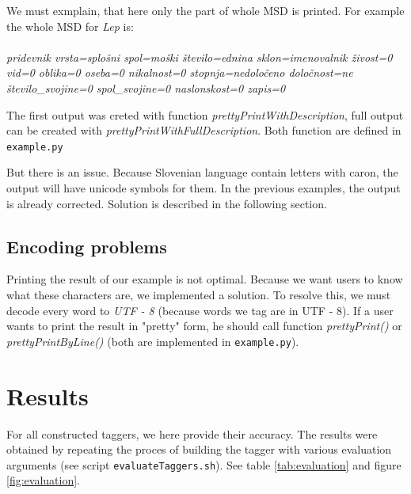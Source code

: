 \documentclass[10pt, conference, compsocconf]{IEEEtran}
\begin{document}
We must exmplain, that here only the part of whole MSD is printed. For example the whole MSD for \textit{Lep} is:\\\\
\textit{pridevnik vrsta=splošni spol=moški število=ednina sklon=imenovalnik živost=0 vid=0 oblika=0 oseba=0 nikalnost=0 stopnja=nedoločeno določnost=ne število\_svojine=0 spol\_svojine=0 naslonskost=0 zapis=0}\\
\par
The first output was creted with function \textit{prettyPrintWithDescription}, full output can be created with \textit{prettyPrintWithFullDescription}. Both function are defined in \texttt{example.py}
\par
But there is an issue. Because Slovenian language contain letters with caron, the output will have unicode symbols for them. In the previous examples, the output is already corrected. Solution is described in the following section. 
\subsection{Encoding problems} %

Printing the result of our example is not optimal. Because we want users to know what these characters are, we implemented a solution. To resolve this, we must decode every word to \textit{UTF - 8} (because words we tag are in UTF - 8). If a user wants to print the result in "pretty" form, he should call function \textit{prettyPrint()} or \textit{prettyPrintByLine()} (both are implemented in \texttt{example.py}).

\section{Results} %
\label{results}
For all constructed taggers, we here provide their accuracy. The results were obtained by repeating the proces of building the tagger with various evaluation arguments (see script \texttt{evaluateTaggers.sh}). See table \ref{tab:evaluation} and figure \ref{fig:evaluation}.
\end{document}
